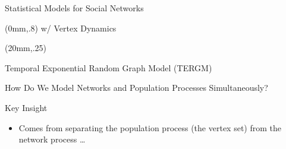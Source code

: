 \documentclass[10pt]{beamer}
\begin{document}
\begin{frame}{Statistical Models for Social Networks}
{\begin{center}
\begin{textblock*}{100mm}(0mm,.8\textheight)
\small{ \alert{w/ Vertex Dynamics \citep{almquist12}}}
\end{textblock*}

\begin{textblock*}{100mm}(20mm,.25\textheight)
\begin{center}
Temporal Exponential Random Graph Model (TERGM) \\
\small{\cite[e.g.,][]{robbins99,xing07}}
\end{center}
\end{textblock*}
\end{center}

}

\end{frame}





\begin{frame}{\normalsize{How Do We Model Networks and Population Processes Simultaneously?}}

\begin{block}{Key Insight}

\begin{itemize}
\item Comes from separating the \alert{population process} (the vertex set) from the \alert{network process} \dots
\end{itemize}

\end{block}

\end{frame}
\end{document}

